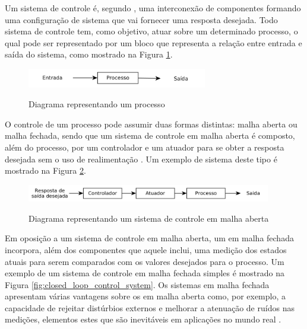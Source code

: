 Um sistema de controle é, segundo , uma interconexão de componentes formando uma configuração de sistema que vai fornecer uma resposta desejada. Todo sistema de controle tem, como objetivo, atuar sobre um determinado processo, o qual pode ser representado por um bloco que representa a relação entre entrada e saída do sistema, como mostrado na Figura \ref{fig:process}.

\begin{figure}[!htb]
    \centering
    \caption{Diagrama representando um processo}
    \includegraphics[width=0.7\textwidth]{./04-figuras/fund_teorica/process}
    \label{fig:process}
\end{figure}

O controle de um processo pode assumir duas formas distintas: malha aberta ou malha fechada, sendo que um sistema de controle em malha aberta é composto, além do processo, por um controlador e um atuador para se obter a resposta desejada sem o uso de realimentação \cite[p.~2]{Dorf2011}. Um exemplo de sistema deste tipo é mostrado na Figura \ref{fig:open_loop_control_system}.

\begin{figure}[!htb]
    \centering
    \caption{Diagrama representando um sistema de controle em malha aberta}
    \includegraphics[width=0.95\textwidth]{./04-figuras/fund_teorica/open_loop_control_system}
    \label{fig:open_loop_control_system}
\end{figure}

Em oposição a um sistema de controle em malha aberta, um em malha fechada incorpora, além dos componentes que aquele inclui, uma medição dos estados atuais para serem comparados com os valores desejados para o processo. Um exemplo de um sistema de controle em malha fechada simples é mostrado na Figura \ref{fig:closed_loop_control_system}. Os sistemas em malha fechada apresentam várias vantagens sobre os em malha aberta como, por exemplo, a capacidade de rejeitar distúrbios externos e melhorar a atenuação de ruídos nas medições, elementos estes que são inevitáveis em aplicações no mundo real \cite[p.~3]{Dorf2011}.

